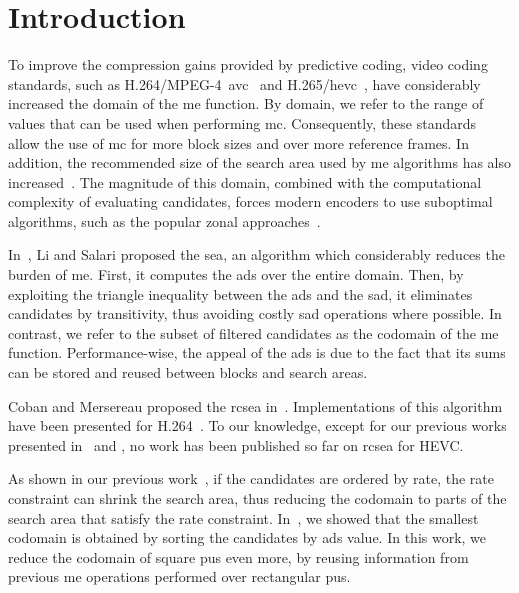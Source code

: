 \documentclass{article}
\begin{document}
\section{Introduction}
\vspace{-0.5em}
To improve the compression gains provided by predictive coding, video coding standards, such as H.264/MPEG-4~\gls{avc}~\cite{H264} and H.265/\gls{hevc}~\cite{HEVC}, have considerably increased the domain of the \gls{me} function. By domain, we refer to the range of values that can be used when performing \gls{mc}. Consequently, these standards allow the use of \gls{mc} for more block sizes and over more reference frames. In addition, the recommended size of the search area used by \gls{me} algorithms has also increased~\cite{McCann2014}. The magnitude of this domain, combined with the computational complexity of evaluating candidates, forces modern encoders to use suboptimal algorithms, such as the popular zonal approaches~\cite{Tourapis2000, Tourapis2002}.

In~\cite{Li1995}, Li and Salari proposed the \gls{sea}, an algorithm which considerably reduces the burden of \gls{me}. First, it computes the \gls{ads} over the entire domain. Then, by exploiting the triangle inequality between the \gls{ads} and the \gls{sad}, it eliminates candidates by transitivity, thus avoiding costly \gls{sad} operations where possible. In contrast, we refer to the subset of filtered candidates as the codomain of the \gls{me} function. Performance-wise, the appeal of the \gls{ads} is due to the fact that its sums can be stored and reused between blocks and search areas.

Coban and Mersereau proposed the \gls{rcsea} in~\cite{Coban1998}. Implementations of this algorithm have been presented for H.264~\cite{Toivonen2004, Yang2004}. To our knowledge, except for our previous works presented in~\cite{Trud14} and \cite{Trud15}, no work has been published so far on \gls{rcsea} for HEVC.

As shown in our previous work~\cite{Trud14}, if the candidates are ordered by rate, the rate constraint can shrink the search area, thus reducing the codomain to parts of the search area that satisfy the rate constraint. In~\cite{Trud15}, we showed that the smallest codomain is obtained by sorting the candidates by \gls{ads} value. In this work, we reduce the codomain of square \glspl{pu} even more, by reusing information from previous \gls{me} operations performed over rectangular \glspl{pu}.
\end{document}
